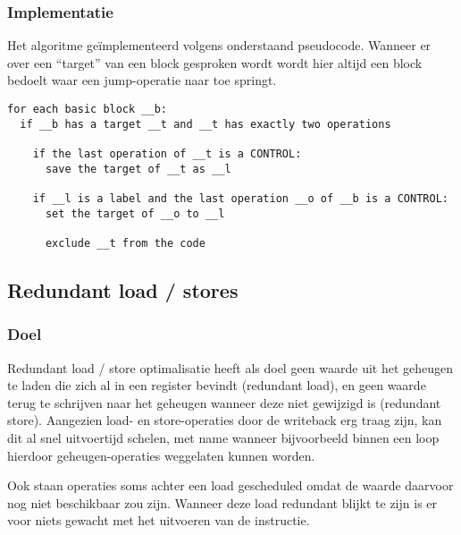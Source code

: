 \documentclass[a4paper,10pt]{article}
\begin{document}
\subsubsection{Implementatie}
Het algoritme ge\"implementeerd volgens onderstaand pseudocode. Wanneer er over
een ``target'' van een block gesproken wordt wordt hier altijd een block
bedoelt waar een jump-operatie naar toe springt.
\begin{verbatim}
for each basic block __b:
  if __b has a target __t and __t has exactly two operations 

    if the last operation of __t is a CONTROL:
      save the target of __t as __l
    
    if __l is a label and the last operation __o of __b is a CONTROL:
      set the target of __o to __l

      exclude __t from the code
\end{verbatim}

\subsection{Redundant load / stores}
\subsubsection{Doel}
Redundant load / store optimalisatie heeft als doel geen waarde uit het
geheugen te laden die zich al in een register bevindt (redundant load), en geen
waarde terug te schrijven naar het geheugen wanneer deze niet gewijzigd is
(redundant store). Aangezien load- en store-operaties door de writeback erg
traag zijn, kan dit al snel uitvoertijd schelen, met name wanneer bijvoorbeeld
binnen een loop hierdoor geheugen-operaties weggelaten kunnen worden.

Ook staan operaties soms achter een load gescheduled omdat de waarde daarvoor
nog niet beschikbaar zou zijn. Wanneer deze load redundant blijkt te zijn is er
voor niets gewacht met het uitvoeren van de instructie.
\end{document}
